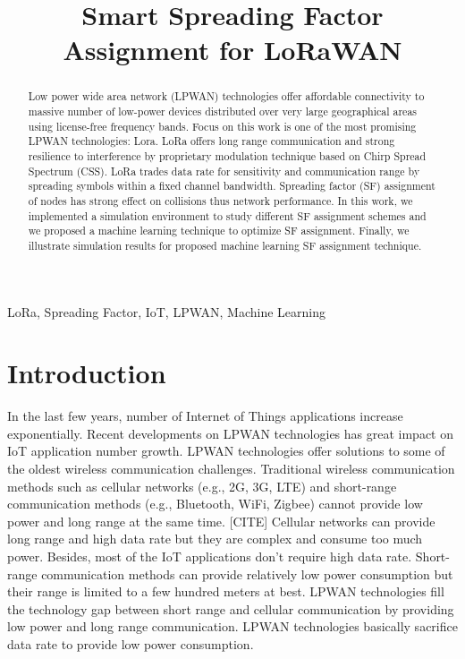 \documentclass[conference]{IEEEtran}
\begin{document}
\title{Smart Spreading Factor Assignment for LoRaWAN
}


\author{
}
\maketitle


\begin{abstract}
Low power wide area network (LPWAN) technologies offer affordable connectivity to massive number of low-power devices distributed over very large geographical areas using license-free frequency bands. Focus on this work is one of the most promising LPWAN technologies: Lora. LoRa offers long range communication and strong resilience to interference by proprietary modulation technique based on Chirp Spread Spectrum (CSS). LoRa trades data rate for sensitivity and communication range by spreading symbols within a fixed channel bandwidth. Spreading factor (SF) assignment of nodes has strong effect on collisions thus network performance. In this work, we implemented a simulation environment to study different SF assignment schemes and we proposed a machine learning technique to optimize SF assignment. Finally, we illustrate simulation results for proposed machine learning SF assignment technique.
\end{abstract}


\begin{IEEEkeywords}
LoRa, Spreading Factor, IoT, LPWAN, Machine Learning
\end{IEEEkeywords}


\section{Introduction}
\par In the last few years, number of Internet of Things applications increase exponentially. \cite{7721743} Recent developments on LPWAN technologies has great impact on IoT application number growth. LPWAN technologies offer solutions to some of the oldest wireless communication challenges. Traditional wireless communication methods such as cellular networks (e.g., 2G, 3G, LTE) and short-range communication methods (e.g., Bluetooth, WiFi, Zigbee) cannot provide low power and long range at the same time. [CITE] Cellular networks can provide long range and high data rate but they are complex and consume too much power. Besides, most of the IoT applications don't require high data rate. Short-range communication methods can provide relatively low power consumption but their range is limited to a few hundred meters at best. \cite{7815384} LPWAN technologies fill the technology gap between short range and cellular communication by providing low power and long range communication. LPWAN technologies basically sacrifice data rate to provide low power consumption.
\end{document}
